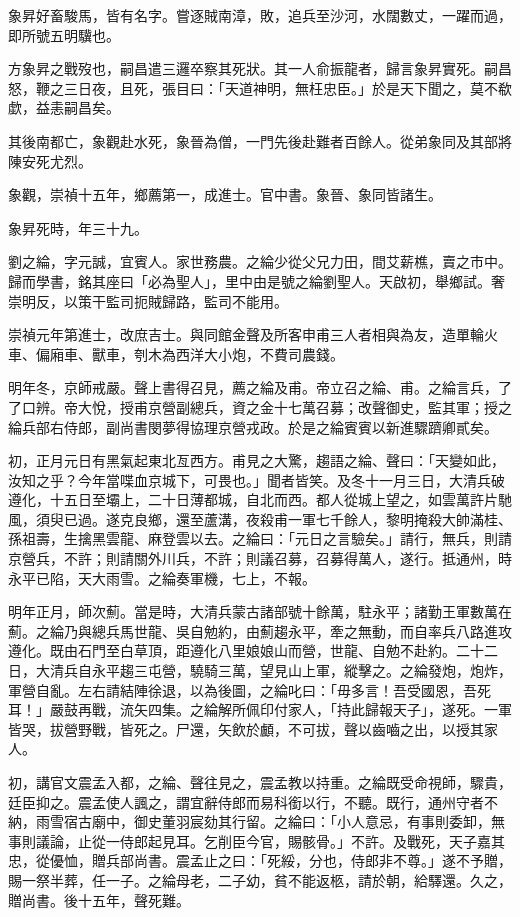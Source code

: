 \begin{pinyinscope}
象昇好畜駿馬，皆有名字。嘗逐賊南漳，敗，追兵至沙河，水闊數丈，一躍而過，即所號五明驥也。

方象昇之戰歿也，嗣昌遣三邏卒察其死狀。其一人俞振龍者，歸言象昇實死。嗣昌怒，鞭之三日夜，且死，張目曰：「天道神明，無枉忠臣。」於是天下聞之，莫不欷歔，益恚嗣昌矣。

其後南都亡，象觀赴水死，象晉為僧，一門先後赴難者百餘人。從弟象同及其部將陳安死尤烈。

象觀，崇禎十五年，鄉薦第一，成進士。官中書。象晉、象同皆諸生。

象昇死時，年三十九。

劉之綸，字元誠，宜賓人。家世務農。之綸少從父兄力田，間艾薪樵，賣之市中。歸而學書，銘其座曰「必為聖人」，里中由是號之綸劉聖人。天啟初，舉鄉試。奢崇明反，以策干監司扼賊歸路，監司不能用。

崇禎元年第進士，改庶吉士。與同館金聲及所客申甫三人者相與為友，造單輪火車、偏廂車、獸車，刳木為西洋大小炮，不費司農錢。

明年冬，京師戒嚴。聲上書得召見，薦之綸及甫。帝立召之綸、甫。之綸言兵，了了口辨。帝大悅，授甫京營副總兵，資之金十七萬召募；改聲御史，監其軍；授之綸兵部右侍郎，副尚書閔夢得協理京營戎政。於是之綸賓賓以新進驟躋卿貳矣。

初，正月元日有黑氣起東北亙西方。甫見之大驚，趨語之綸、聲曰：「天變如此，汝知之乎？今年當喋血京城下，可畏也。」聞者皆笑。及冬十一月三日，大清兵破遵化，十五日至壩上，二十日薄都城，自北而西。都人從城上望之，如雲萬許片馳風，須臾已過。遂克良鄉，還至蘆溝，夜殺甫一軍七千餘人，黎明掩殺大帥滿桂、孫祖壽，生擒黑雲龍、麻登雲以去。之綸曰：「元日之言驗矣。」請行，無兵，則請京營兵，不許；則請關外川兵，不許；則議召募，召募得萬人，遂行。抵通州，時永平已陷，天大雨雪。之綸奏軍機，七上，不報。

明年正月，師次薊。當是時，大清兵蒙古諸部號十餘萬，駐永平；諸勤王軍數萬在薊。之綸乃與總兵馬世龍、吳自勉約，由薊趨永平，牽之無動，而自率兵八路進攻遵化。既由石門至白草頂，距遵化八里娘娘山而營，世龍、自勉不赴約。二十二日，大清兵自永平趨三屯營，驍騎三萬，望見山上軍，縱擊之。之綸發炮，炮炸，軍營自亂。左右請結陣徐退，以為後圖，之綸叱曰：「毋多言！吾受國恩，吾死耳！」嚴鼓再戰，流矢四集。之綸解所佩印付家人，「持此歸報天子」，遂死。一軍皆哭，拔營野戰，皆死之。尸還，矢飲於顱，不可拔，聲以齒嚙之出，以授其家人。

初，講官文震孟入都，之綸、聲往見之，震孟教以持重。之綸既受命視師，驟貴，廷臣抑之。震孟使人諷之，謂宜辭侍郎而易科銜以行，不聽。既行，通州守者不納，雨雪宿古廟中，御史董羽宸劾其行留。之綸曰：「小人意忌，有事則委卸，無事則議論，止從一侍郎起見耳。乞削臣今官，賜骸骨。」不許。及戰死，天子嘉其忠，從優恤，贈兵部尚書。震孟止之曰：「死綏，分也，侍郎非不尊。」遂不予贈，賜一祭半葬，任一子。之綸母老，二子幼，貧不能返柩，請於朝，給驛還。久之，贈尚書。後十五年，聲死難。


\end{pinyinscope}
